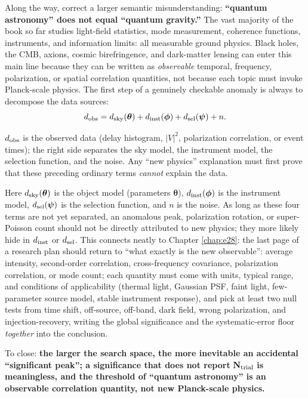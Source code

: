 Along the way, correct a larger semantic misunderstanding: \textbf{``quantum astronomy'' does not equal ``quantum gravity.''} The vast majority of the book so far studies light-field statistics, mode measurement, coherence functions, instruments, and information limits: all measurable ground physics. Black holes, the CMB, axions, cosmic birefringence, and dark-matter lensing can enter this main line because they can be written as \emph{observable} temporal, frequency, polarization, or spatial correlation quantities, not because each topic must invoke Planck-scale physics. The first step of a genuinely checkable anomaly is always to decompose the data sources:
\begin{equation}
  d_{\rm obs}=d_{\rm sky}(\boldsymbol\theta)
  +d_{\rm inst}(\boldsymbol\phi)
  +d_{\rm sel}(\boldsymbol\psi)
  +n.
  \label{eq:e27-data-model}
\end{equation}
\begin{formulaexplain}
\(d_{\rm obs}\) is the observed data (delay histogram, \(|V|^2\), polarization correlation, or event times); the right side separates the sky model, the instrument model, the selection function, and the noise. Any ``new physics'' explanation must first prove that these preceding ordinary terms \emph{cannot} explain the data.
\end{formulaexplain}

Here \(d_{\rm sky}(\boldsymbol\theta)\) is the object model (parameters \(\boldsymbol\theta\)), \(d_{\rm inst}(\boldsymbol\phi)\) is the instrument model, \(d_{\rm sel}(\boldsymbol\psi)\) is the selection function, and \(n\) is the noise. As long as these four terms are not yet separated, an anomalous peak, polarization rotation, or super-Poisson count should not be directly attributed to new physics; they more likely hide in \(d_{\rm inst}\) or \(d_{\rm sel}\). This connects neatly to Chapter \ref{chap:e28}: the last page of a research plan should return to ``what exactly is the new observable'': average intensity, second-order correlation, cross-frequency covariance, polarization correlation, or mode count; each quantity must come with units, typical range, and conditions of applicability (thermal light, Gaussian PSF, faint light, few-parameter source model, stable instrument response), and pick at least two null tests from time shift, off-source, off-band, dark field, wrong polarization, and injection-recovery, writing the global significance and the systematic-error floor \emph{together} into the conclusion.

To close: \textbf{the larger the search space, the more inevitable an accidental ``significant peak''; a significance that does not report }\(\mathbf{N_{\rm trial}}\)\textbf{ is meaningless, and the threshold of ``quantum astronomy'' is an observable correlation quantity, not new Planck-scale physics.}


